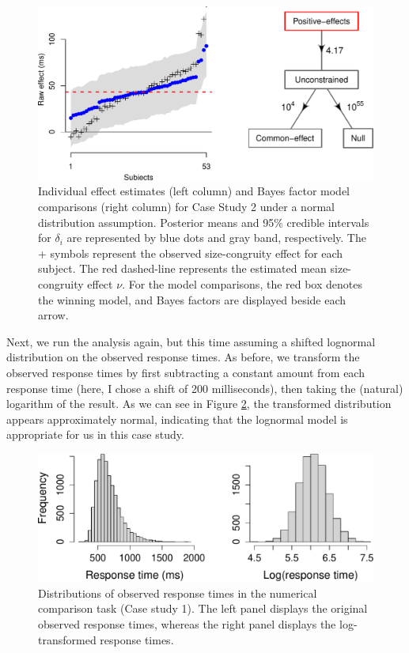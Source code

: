 \documentclass[12pt,twoside,a4paper]{article}
\begin{document}
\begin{figure}[htbp]
\centering
\includegraphics[width=\textwidth]{plot2-1.pdf}
\caption{\label{fig:plot2}Individual effect estimates (left column) and Bayes factor model comparisons (right column) for Case Study 2 under a normal distribution assumption. Posterior means and 95\% credible intervals for \(\delta_i\) are represented by blue dots and gray band, respectively. The + symbols represent the observed size-congruity effect for each subject. The red dashed-line represents the estimated mean size-congruity effect \(\nu\). For the model comparisons, the red box denotes the winning model, and Bayes factors are displayed beside each arrow.}
\end{figure}

Next, we run the analysis again, but this time assuming a shifted lognormal distribution on the observed response times. As before, we transform the observed response times by first subtracting a constant amount from each response time (here, I chose a shift of 200 milliseconds), then taking the (natural) logarithm of the result. As we can see in Figure \ref{fig:plotTransform2}, the transformed distribution appears approximately normal, indicating that the lognormal model is appropriate for us in this case study.\\

\begin{figure}[htbp]
\centering
\includegraphics[width=\textwidth]{plotTransform2-1.pdf}
\caption{\label{fig:plotTransform2}Distributions of observed response times in the numerical comparison task (Case study 1). The left panel displays the original observed response times, whereas the right panel displays the log-transformed response times.}
\end{figure}
\end{document}
